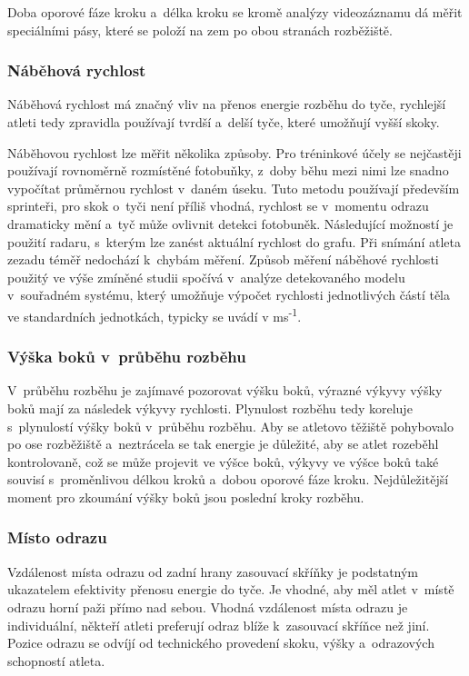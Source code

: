 Doba oporové fáze kroku a~délka kroku se kromě analýzy videozáznamu dá měřit speciálními pásy, které se položí na zem po obou stranách rozběžiště.

\subsubsection{Náběhová rychlost}

Náběhová rychlost má značný vliv na přenos energie rozběhu do tyče, rychlejší atleti tedy zpravidla používají tvrdší a~delší tyče, které umožňují vyšší skoky.

Náběhovou rychlost lze měřit několika způsoby. Pro tréninkové účely se nejčastěji používají rovnoměrně rozmístěné fotobuňky, z~doby běhu mezi nimi lze snadno vypočítat průměrnou rychlost v~daném úseku. Tuto metodu používají především sprinteři, pro skok o~tyči není příliš vhodná, rychlost se v~momentu odrazu dramaticky mění a~tyč může ovlivnit detekci fotobuněk. Následující možností je použití radaru, s~kterým lze zanést aktuální rychlost do grafu. Při snímání atleta zezadu téměř nedochází k~chybám měření. Způsob měření náběhové rychlosti použitý ve výše zmíněné studii \citep{IAAF2017} spočívá v~analýze detekovaného modelu v~souřadném systému, který umožňuje výpočet rychlosti jednotlivých částí těla ve standardních jednotkách, typicky se uvádí v ms\textsuperscript{-1}.

\subsubsection{Výška boků v~průběhu rozběhu}

V~průběhu rozběhu je zajímavé pozorovat výšku boků, výrazné výkyvy výšky boků mají za následek výkyvy rychlosti. Plynulost rozběhu tedy koreluje s~plynulostí výšky boků v~průběhu rozběhu. Aby se atletovo těžiště pohybovalo po ose rozběžiště a~neztrácela se tak energie je důležité, aby se atlet rozeběhl kontrolovaně, což se může projevit ve výšce boků, výkyvy ve výšce boků také souvisí s~proměnlivou délkou kroků a~dobou oporové fáze kroku. Nejdůležitější moment pro zkoumání výšky boků jsou poslední kroky rozběhu.

\subsubsection{Místo odrazu}

Vzdálenost místa odrazu od zadní hrany zasouvací skříňky je podstatným ukazatelem efektivity přenosu energie do tyče. Je vhodné, aby měl atlet v~místě odrazu horní paži přímo nad sebou. Vhodná vzdálenost místa odrazu je individuální, někteří atleti preferují odraz blíže k~zasouvací skříňce než jiní. Pozice odrazu se odvíjí od technického provedení skoku, výšky a~odrazových schopností atleta.

